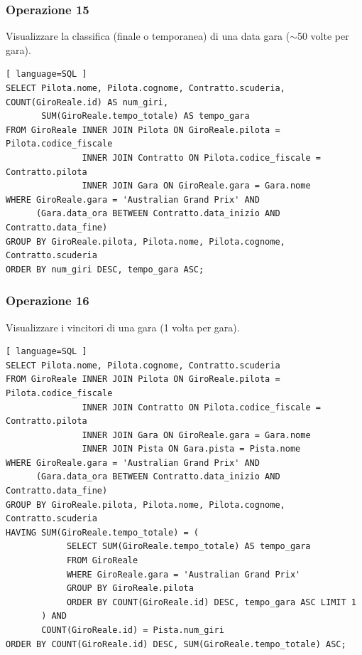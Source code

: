 \documentclass[11pt]{article}
\begin{document}
\subsubsection{Operazione 15}
Visualizzare la classifica (finale o temporanea) di una data gara ($\sim$50 volte per gara).
\begin{lstlisting}[ language=SQL ]
SELECT Pilota.nome, Pilota.cognome, Contratto.scuderia, COUNT(GiroReale.id) AS num_giri, 
       SUM(GiroReale.tempo_totale) AS tempo_gara
FROM GiroReale INNER JOIN Pilota ON GiroReale.pilota = Pilota.codice_fiscale
               INNER JOIN Contratto ON Pilota.codice_fiscale = Contratto.pilota
               INNER JOIN Gara ON GiroReale.gara = Gara.nome
WHERE GiroReale.gara = 'Australian Grand Prix' AND
      (Gara.data_ora BETWEEN Contratto.data_inizio AND Contratto.data_fine)
GROUP BY GiroReale.pilota, Pilota.nome, Pilota.cognome, Contratto.scuderia
ORDER BY num_giri DESC, tempo_gara ASC;
\end{lstlisting}


\subsubsection{Operazione 16}
Visualizzare i vincitori di una gara (1 volta per gara).
\begin{lstlisting}[ language=SQL ]
SELECT Pilota.nome, Pilota.cognome, Contratto.scuderia
FROM GiroReale INNER JOIN Pilota ON GiroReale.pilota = Pilota.codice_fiscale
               INNER JOIN Contratto ON Pilota.codice_fiscale = Contratto.pilota
               INNER JOIN Gara ON GiroReale.gara = Gara.nome
               INNER JOIN Pista ON Gara.pista = Pista.nome
WHERE GiroReale.gara = 'Australian Grand Prix' AND
      (Gara.data_ora BETWEEN Contratto.data_inizio AND Contratto.data_fine)
GROUP BY GiroReale.pilota, Pilota.nome, Pilota.cognome, Contratto.scuderia
HAVING SUM(GiroReale.tempo_totale) = (
            SELECT SUM(GiroReale.tempo_totale) AS tempo_gara
            FROM GiroReale
            WHERE GiroReale.gara = 'Australian Grand Prix'
            GROUP BY GiroReale.pilota
            ORDER BY COUNT(GiroReale.id) DESC, tempo_gara ASC LIMIT 1
       ) AND
       COUNT(GiroReale.id) = Pista.num_giri
ORDER BY COUNT(GiroReale.id) DESC, SUM(GiroReale.tempo_totale) ASC;
\end{lstlisting}
\end{document}
